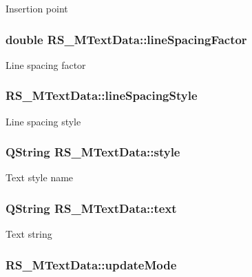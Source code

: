 Insertion point \hypertarget{classRS__MTextData_a065b68a34a4049cf33063b726049525f}{
\subsubsection[{line\-Spacing\-Factor}]{\setlength{\rightskip}{0pt plus 5cm}double R\-S\-\_\-\-M\-Text\-Data\-::line\-Spacing\-Factor}}\label{classRS__MTextData_a065b68a34a4049cf33063b726049525f}
Line spacing factor \hypertarget{classRS__MTextData_a67cb4ea65820958aa4b820d988bec25e}{
\subsubsection[{line\-Spacing\-Style}]{ R\-S\-\_\-\-M\-Text\-Data\-::line\-Spacing\-Style}}\label{classRS__MTextData_a67cb4ea65820958aa4b820d988bec25e}
Line spacing style \hypertarget{classRS__MTextData_ad804c51861eb1e111cdb281b412f7cb5}{
\subsubsection[{style}]{\setlength{\rightskip}{0pt plus 5cm}Q\-String R\-S\-\_\-\-M\-Text\-Data\-::style}}\label{classRS__MTextData_ad804c51861eb1e111cdb281b412f7cb5}
Text style name \hypertarget{classRS__MTextData_ae12dd4012706f9fbda7298b5fd0ec52e}{
\subsubsection[{text}]{\setlength{\rightskip}{0pt plus 5cm}Q\-String R\-S\-\_\-\-M\-Text\-Data\-::text}}\label{classRS__MTextData_ae12dd4012706f9fbda7298b5fd0ec52e}
Text string \hypertarget{classRS__MTextData_a870f67ddc1085f966d1f1fc3d87c8aaa}{
\subsubsection[{update\-Mode}]{ R\-S\-\_\-\-M\-Text\-Data\-::update\-Mode}}\label{classRS__MTextData_a870f67ddc1085f966d1f1fc3d87c8aaa}
